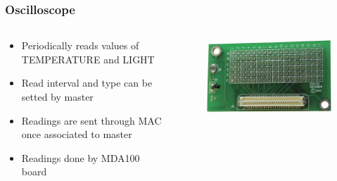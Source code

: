 \begin{frame}[fragile]
 \frametitle{Oscilloscope}
 \begin{columns}
    \begin{column}{.58\linewidth}
      \begin{itemize}
      	\item Periodically reads values of TEMPERATURE and LIGHT
      	\item Read interval and type can be setted by master
      	\item Readings are sent through MAC once associated to master
      	\item Readings done by MDA100 board
      \end{itemize}
    \end{column}
    \hfill
    \begin{column}{.4\linewidth}
      \begin{figure}
	\includegraphics[width=\textwidth]{img/mda100.jpg}
      \end{figure}
    \end{column}
  \end{columns}
\end{frame}

